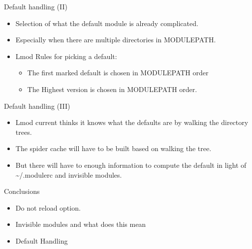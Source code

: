\documentclass{beamer}
\begin{document}
\begin{frame}{Default handling (II)}
  \begin{itemize}
    \item Selection of what the default module is already complicated.
    \item Especially when there are multiple directories in MODULEPATH.
    \item Lmod Rules for picking a default:
      \begin{itemize}
        \item The first marked default is chosen in MODULEPATH order
        \item The Highest version is chosen in MODULEPATH order.
      \end{itemize}
  \end{itemize}
\end{frame}

\begin{frame}{Default handling (III)}
  \begin{itemize}
    \item Lmod current thinks it knows what the defaults are by
      walking the directory trees.
    \item The spider cache will have to be built based on walking the
      tree.
    \item But there will have to enough information to compute the
      default in light of \textasciitilde/.modulerc and invisible modules.
  \end{itemize}
\end{frame}

\begin{frame}{Conclusions}
  \begin{itemize}
    \item Do not reload option.
    \item Invisible modules and what does this mean
    \item Default Handling  
  \end{itemize}
\end{frame}
\end{document}

